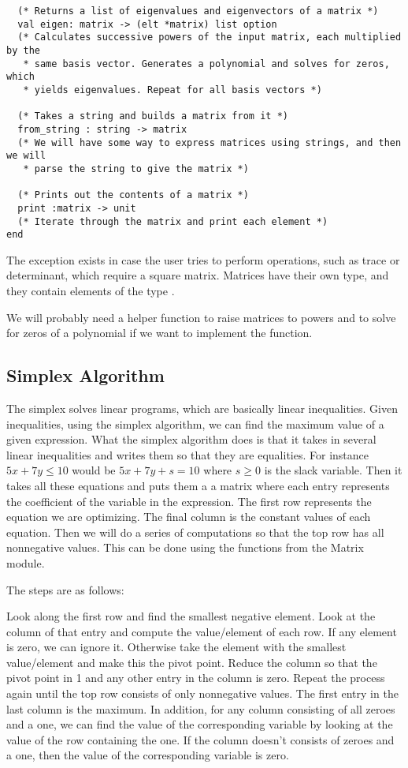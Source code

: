 \documentclass[letterpaper,11pt]{article}
\begin{document}
\begin{verbatim}
  (* Returns a list of eigenvalues and eigenvectors of a matrix *)
  val eigen: matrix -> (elt *matrix) list option
  (* Calculates successive powers of the input matrix, each multiplied by the
   * same basis vector. Generates a polynomial and solves for zeros, which 
   * yields eigenvalues. Repeat for all basis vectors *)

  (* Takes a string and builds a matrix from it *)
  from_string : string -> matrix
  (* We will have some way to express matrices using strings, and then we will
   * parse the string to give the matrix *)
  
  (* Prints out the contents of a matrix *)   
  print :matrix -> unit
  (* Iterate through the matrix and print each element *)
end
\end{verbatim}

The exception exists in case the user tries to perform operations, such as trace
or determinant, which require a square matrix. Matrices have their own type, and
they contain elements of the type \verb@elt@. 

We will probably need a helper function to raise matrices to powers and to solve
for zeros of a polynomial if we want to implement the \verb@eigen@ function. 

\subsection{Simplex Algorithm}

The simplex solves linear programs, which are basically linear inequalities.
Given inequalities, using the simplex algorithm, we can find the maximum value
of a given expression. What the simplex algorithm does is that it takes in
several linear inequalities and writes them so that they are equalities. For
instance $5x + 7y \leq 10$ would be $5x + 7y + s = 10$ where $s \geq 0$ is the
slack variable. Then it takes all these equations and puts them a a matrix where
each entry represents the coefficient of the variable in the expression. The
first row represents the equation we are optimizing. The final column is the
constant values of each equation. Then we will do a series of computations so
that the top row has all nonnegative values. This can be done using the
functions from the Matrix module. 

The steps are as follows:

Look along the first row and find the smallest negative element. Look at the
column of that entry and compute the value/element of each row. If any element
is zero, we can ignore it. Otherwise take the element with the smallest
value/element and make this the pivot point. Reduce the column so that the pivot
point in 1 and any other entry in the column is zero. Repeat the process again
until the top row consists of only nonnegative values. The first entry in the
last column is the maximum. In addition, for any column consisting of all zeroes
and a one, we can find the value of the corresponding variable by looking at the
value of the row containing the one. If the column doesn’t consists of zeroes
and a one, then the value of the corresponding variable is zero. 
\end{document}
